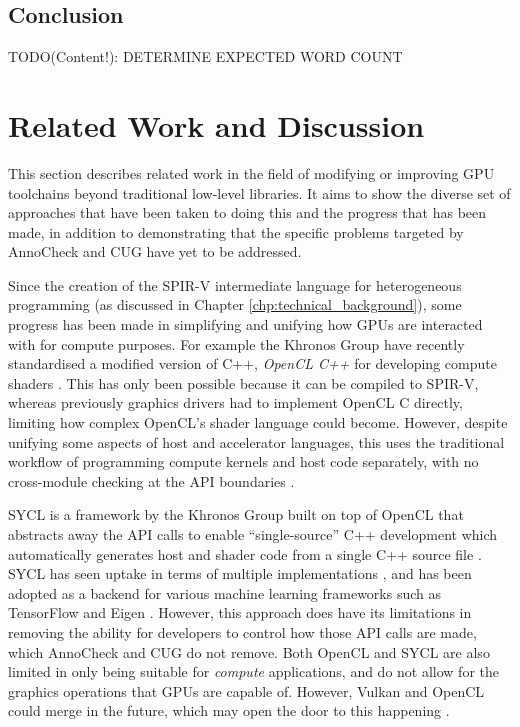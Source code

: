 \documentclass[a4paper,12pt,twoside,openright]{report}
\begin{document}
\section{Conclusion}

TODO(Content!): DETERMINE EXPECTED WORD COUNT

\chapter{Related Work and Discussion}



\label{chp:related_work}

This section describes related work in the field of modifying or improving GPU
toolchains beyond traditional low-level libraries. It aims to show the diverse
set of approaches that have been taken to doing this and the progress that has
been made, in addition to demonstrating that the specific problems targeted by
AnnoCheck and CUG have yet to be addressed.

Since the creation of the SPIR-V intermediate language for heterogeneous
programming (as discussed in Chapter \ref{chp:technical_background}), some
progress has been made in simplifying and unifying how GPUs are interacted with
for compute purposes. For example the Khronos Group have recently standardised
a modified version of C++, \textit{OpenCL C++} for developing compute shaders
\cite{OpenCL22Release} \cite{OpenCLCPPWhitePaper} \cite{OpenCL}. This has only
been possible because it can be compiled to SPIR-V, whereas previously graphics
drivers had to implement OpenCL C directly, limiting how complex OpenCL's
shader language could become. However, despite unifying some aspects of host
and accelerator languages, this uses the traditional workflow of programming
compute kernels and host code separately, with no cross-module checking at the
API boundaries \cite{OpenCL22Release}.

SYCL is a framework by the Khronos Group built on top of OpenCL that abstracts
away the API calls to enable ``single-source'' C++ development which
automatically generates host and shader code from a single C++ source file
\cite{OpenCL22Release} \cite{SYCL}. SYCL has seen uptake in terms of multiple
implementations \cite{ComputeCPP} \cite{triSYCL}, and has been adopted as a
backend for various machine learning frameworks such as TensorFlow and Eigen
\cite{SYCLTensorFlow} \cite{SYCLEigen}. However, this approach does have its
limitations in removing the ability for developers to control how those API
calls are made, which AnnoCheck and CUG do not remove. Both OpenCL and SYCL are
also limited in only being suitable for \textit{compute} applications, and do
not allow for the graphics operations that GPUs are capable of. However, Vulkan
and OpenCL could merge in the future, which may open the door to this happening
\cite{VulkanOpenCLMerge}.
\end{document}
